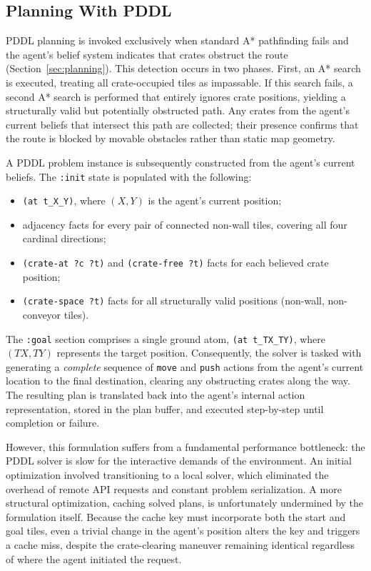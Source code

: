 \subsection{Planning With PDDL}
PDDL planning is invoked exclusively when standard A* pathfinding fails and the agent's belief system indicates that crates obstruct the route (Section~\ref{sec:planning}).
This detection occurs in two phases. First, an A* search is executed, treating all crate-occupied tiles as impassable. 
If this search fails, a second A* search is performed that entirely ignores crate positions, yielding a structurally valid but potentially obstructed path. 
Any crates from the agent's current beliefs that intersect this path are collected; their presence confirms that the route is blocked by movable obstacles rather than static map geometry.

A PDDL problem instance is subsequently constructed from the agent's current beliefs.
The \texttt{:init} state is populated with the following:
\begin{itemize}[noitemsep]
    \item \texttt{(at t\_X\_Y)}, where $(X, Y)$ is the agent's current position;
    \item adjacency facts for every pair of connected non-wall tiles, covering all four cardinal directions;
    \item \texttt{(crate-at ?c ?t)} and \texttt{(crate-free ?t)} facts for each believed crate position;
    \item \texttt{(crate-space ?t)} facts for all structurally valid positions (non-wall, non-conveyor tiles).
\end{itemize}
The \texttt{:goal} section comprises a single ground atom, \texttt{(at t\_TX\_TY)}, where $(TX, TY)$ represents the target position.
Consequently, the solver is tasked with generating a \textit{complete} sequence of \texttt{move} and \texttt{push} actions from the agent's 
current location to the final destination, clearing any obstructing crates along the way.
The resulting plan is translated back into the agent's internal action representation, stored in the plan buffer, and executed step-by-step until completion or failure.

However, this formulation suffers from a fundamental performance bottleneck: the PDDL solver is slow for the interactive demands of the environment.
An initial optimization involved transitioning to a local solver, which eliminated the overhead of remote API requests and constant problem serialization. 
A more structural optimization, caching solved plans, is unfortunately undermined by the formulation itself. 
Because the cache key must incorporate both the start and goal tiles, even a trivial change in the agent's position alters the key and triggers a cache miss, 
despite the crate-clearing maneuver remaining identical regardless of where the agent initiated the request.

